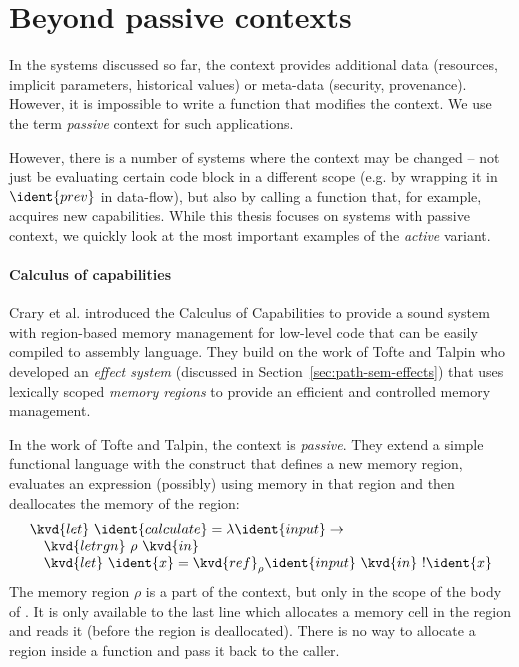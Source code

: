 
\section{Beyond passive contexts}

In the systems discussed so far, the context provides additional data (resources, implicit 
parameters, historical values) or meta-data (security, provenance). However, it is impossible to
write a function that modifies the context. We use the term \emph{passive} context for such 
applications. 

However, there is a number of systems where the context may be changed -- not just be evaluating
certain code block in a different scope (e.g. by wrapping it in $\ident{prev}$ in data-flow), but
also by calling a function that, for example, acquires new capabilities. While this thesis focuses
on systems with passive context, we quickly look at the most important examples of the 
\emph{active} variant.


\paragraph{Calculus of capabilities}
Crary et al. \cite{app-capabilities} introduced the Calculus of Capabilities to provide 
a sound system with region-based memory management for low-level code that can be easily 
compiled to assembly language. They build on the work of Tofte and Talpin \cite{app-region-memory}
who developed an \emph{effect system} (discussed in Section~\ref{sec:path-sem-effects}) that uses
lexically scoped \emph{memory regions} to provide an efficient and controlled memory management.

In the work of Tofte and Talpin, the context is \emph{passive}. They extend a simple functional language
with the  construct that defines a new memory region, evaluates an expression (possibly)
using memory in that region and then deallocates the memory of the region:
%
\begin{equation*}
\begin{array}{l}
\kvd{let}~\ident{calculate} = \lambda \ident{input} \rightarrow\\
\quad\kvd{letrgn}~\rho~\kvd{in}\\
\quad\kvd{let}~\ident{x} = \kvd{ref}_\rho \ident{input}~\kvd{in}~!\ident{x}
\end{array}
\end{equation*}
%
The memory region $\rho$ is a part of the context, but only in the scope of the body of 
. It is only available to the last line which allocates a memory cell in the region
and reads it (before the region is deallocated). There is no way to allocate a region inside a 
function and pass it back to the caller.

